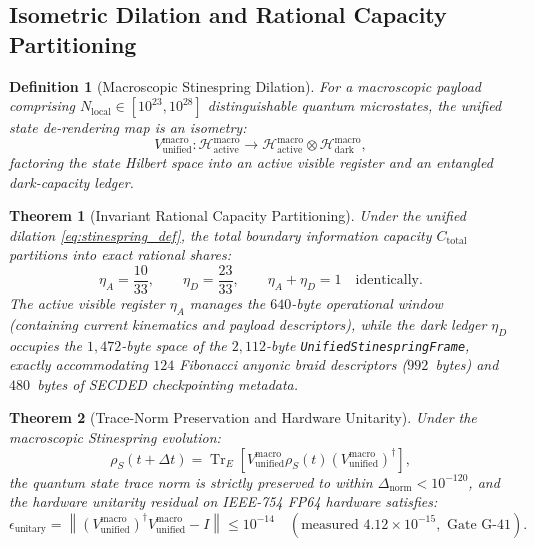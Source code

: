 \documentclass[11pt,onecolumn]{article}
\newtheorem{theorem}{Theorem}
\newtheorem{definition}{Definition}
\DeclareMathOperator{\Tr}{Tr}
\begin{document}
\subsection{Isometric Dilation and Rational Capacity Partitioning}
\begin{definition}[Macroscopic Stinespring Dilation]
For a macroscopic payload comprising $N_{\text{local}} \in [10^{23}, 10^{28}]$ distinguishable quantum microstates, the unified state de-rendering map is an isometry:
\begin{equation}
V_{\text{unified}}^{\text{macro}} : \mathcal{H}_{\text{active}}^{\text{macro}} \longrightarrow \mathcal{H}_{\text{active}}^{\text{macro}} \otimes \mathcal{H}_{\text{dark}}^{\text{macro}},
\label{eq:stinespring_def}
\end{equation}
factoring the state Hilbert space into an active visible register and an entangled dark-capacity ledger.
\end{definition}

\begin{theorem}[Invariant Rational Capacity Partitioning]
Under the unified dilation \eqref{eq:stinespring_def}, the total boundary information capacity $C_{\text{total}}$ partitions into exact rational shares:
\begin{equation}
\eta_A = \frac{10}{33}, \qquad \eta_D = \frac{23}{33}, \qquad \eta_A + \eta_D = 1 \quad \text{identically}.
\label{eq:capacity_partition}
\end{equation}
The active visible register $\eta_A$ manages the $640$-byte operational window (containing current kinematics and payload descriptors), while the dark ledger $\eta_D$ occupies the $1{,}472$-byte space of the $2{,}112$-byte \texttt{UnifiedStinespringFrame}, exactly accommodating $124$ Fibonacci anyonic braid descriptors ($992$~bytes) and $480$~bytes of SECDED checkpointing metadata.
\end{theorem}

\begin{theorem}[Trace-Norm Preservation and Hardware Unitarity]
Under the macroscopic Stinespring evolution:
\begin{equation}
\rho_S(t + \Delta t) = \Tr_E \!\left[ V_{\text{unified}}^{\text{macro}} \rho_S(t) \left(V_{\text{unified}}^{\text{macro}}\right)^\dagger \right],
\end{equation}
the quantum state trace norm is strictly preserved to within $\Delta_{\text{norm}} < 10^{-120}$, and the hardware unitarity residual on IEEE-754 FP64 hardware satisfies:
\begin{equation}
\epsilon_{\text{unitary}} = \left\| \left(V_{\text{unified}}^{\text{macro}}\right)^\dagger V_{\text{unified}}^{\text{macro}} - I \right\| \le 10^{-14} \quad (\text{measured } 4.12 \times 10^{-15}, \text{ Gate G-41}).
\end{equation}
\end{theorem}
\end{document}
